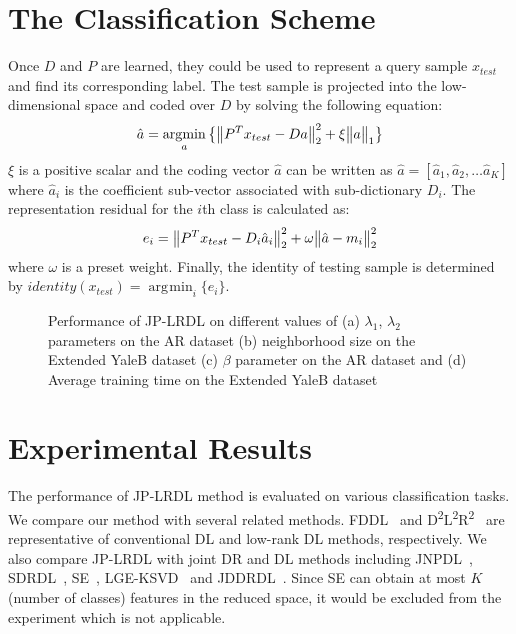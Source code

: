\documentclass[journal]{IEEEtran}
\DeclareMathOperator*{\argmin}{\arg\!\min}
\DeclarePairedDelimiter\norm{\lVert}{\rVert}
\begin{document}
\section{The Classification Scheme}
\label{sec:classification}
Once $D$ and $P$ are learned, they could be used to represent a query sample $x_{test}$ and find its corresponding label. The test sample is projected into the low-dimensional space and coded over $D$ by solving the following equation:
\begin{gather}
\hat{a} = \argmin_{a} \big\{ \norm[\big]{P^T x_{test} - D a}_{2}^2 + \xi \norm[\big]{a}_{1} \big\}
\label{eq24}
\end{gather}
$\xi$ is a positive scalar and the coding vector $\hat{a}$ can be written as $\hat{a} = [\hat{a}_1, \hat{a}_2, \dots \hat{a}_K]$ where $\hat{a}_i$ is the coefficient sub-vector associated with sub-dictionary $D_i$. The representation residual for the $i$th class is calculated as:
\begin{gather}
e_i = \norm[\big]{P^T x_{test} - D_i \hat{a}_i}_{2}^2 + \omega \norm[\big]{\hat{a} - m_i}_{2}^2 
\label{eq25}
\end{gather}
where $\omega$ is a preset weight. Finally, the identity of testing sample is determined by $identity(x_{test}) = \argmin_{i} \{e_i\}$.
\begin{figure}[b]
\centering
{}  
\hspace{2pt} 
\vspace{0.2em} 
\hspace{2pt} 
\caption{Performance of JP-LRDL on different values of (a) $\lambda_1$, $\lambda_2$ parameters on the AR dataset (b) neighborhood size on the Extended YaleB dataset (c) $\beta$ parameter on the AR dataset and (d) Average training time on the Extended YaleB dataset}
\vspace{-1.5em}
\end{figure} 
\section{Experimental Results}
\label{sec:experiment}
The performance of JP-LRDL method is evaluated on various classification tasks. We compare our method with several related methods. FDDL~\cite{FDDL} and D\textsuperscript{2}L\textsuperscript{2}R\textsuperscript{2}~\cite{D2L2R2} are representative of conventional DL and low-rank DL methods, respectively. We also compare JP-LRDL with joint DR and DL methods including JNPDL~\cite{JNPDL}, SDRDL~\cite{Simul-DL}, SE~\cite{SE}, LGE-KSVD~\cite{LGE-KSVD} and JDDRDL~\cite{JDDRDL}. Since SE can obtain at most $K$ (number of classes) features in the reduced space, it would be excluded from the experiment which is not applicable.
\end{document}
